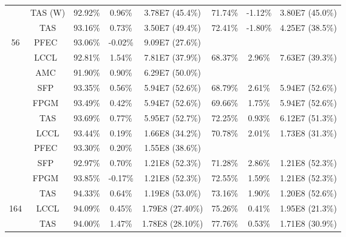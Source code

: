 \documentclass{article}
\def\NAME{{TAS}}
\begin{document}
\begin{table}[t]
\begin{tabular}{c c c c c c c c}
                          & {\NAME} (W)             &  92.92\%   & 0.96\%    & 3.78E7 (45.4\%) & 71.74\%    & -1.12\%   & 3.80E7 (45.0\%)  \\
                          & {\NAME}                 &  93.16\%   & 0.73\%    & 3.50E7 (49.4\%) & 72.41\%    & -1.80\%   & 4.25E7 (38.5\%)  \\
     \midrule
\multirow{7}{*}{56}
                          &PFEC~\cite{li2017pruning}&  93.06\%   & -0.02\%   & 9.09E7 (27.6\%) &         &        &              \\
&LCCL~\cite{dong2017more} &  92.81\%   & 1.54\%    & 7.81E7 (37.9\%) &  68.37\%   &   2.96\%  &  7.63E7 (39.3\%) \\
                          & AMC~\cite{he2018amc}    &  91.90\%   & 0.90\%    & 6.29E7 (50.0\%) &         &        &              \\
                          & SFP~\cite{he2018soft}   &  93.35\%   & 0.56\%    & 5.94E7 (52.6\%) &  68.79\%   &   2.61\%  &  5.94E7 (52.6\%) \\
                          &FPGM~\cite{he2019pruning}&  93.49\%   & 0.42\%    & 5.94E7 (52.6\%) &  69.66\%   &   1.75\%  &  5.94E7 (52.6\%) \\\cmidrule[0.5pt](lr){2-8}
& {\NAME}                 &  93.69\%   & 0.77\%    & 5.95E7 (52.7\%) &  72.25\%   &   0.93\%  &  6.12E7 (51.3\%)  \\
      \midrule
\multirow{5}{*}{110}
                          &LCCL\cite{dong2017more}  &  93.44\%   & 0.19\%    & 1.66E8 (34.2\%) &  70.78\%   &   2.01\%  &  1.73E8 (31.3\%)   \\
                          &PFEC~\cite{li2017pruning}&  93.30\%   & 0.20\%    & 1.55E8 (38.6\%) &         &        &      \\
                          &SFP~\cite{he2018soft}    &  92.97\%   & 0.70\%    & 1.21E8 (52.3\%) &  71.28\%   &   2.86\%  &  1.21E8 (52.3\%)   \\
                          &FPGM~\cite{he2019pruning}&  93.85\%   & -0.17\%    & 1.21E8 (52.3\%) &  72.55\%   &   1.59\%  &  1.21E8 (52.3\%)   \\\cmidrule[0.5pt](lr){2-8}
                          & {\NAME}                 &  94.33\%   & 0.64\%    & 1.19E8 (53.0\%) &  73.16\%   &   1.90\%  &  1.20E8 (52.6\%)  \\
      \midrule
\multirow{2}{*}{164}
                          &LCCL\cite{dong2017more}  &  94.09\%   & 0.45\%    & 1.79E8 (27.40\%)&  75.26\%   &   0.41\%  &  1.95E8 (21.3\%) \\\cmidrule[0.5pt](lr){2-8}
                          & {\NAME}                 &  94.00\%   & 1.47\%    & 1.78E8 (28.10\%)&  77.76\%   &   0.53\%  &  1.71E8 (30.9\%) \\
    \bottomrule
  \end{tabular}
  \vspace{-2mm}
  \label{table:CIFAR-SOTA}
\end{table}
\end{document}
